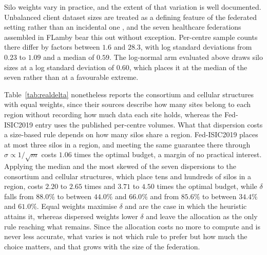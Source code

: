 \documentclass[acmsmall,screen,review,anonymous]{acmart}
\theoremstyle{acmdefinition}%
\begin{document}
Silo weights vary in practice, and the extent of that variation is well
documented. Unbalanced client dataset sizes are treated as a defining feature of
the federated setting rather than an incidental one \cite{kairouz2021advances},
and the seven healthcare federations assembled in FLamby
\cite{terrail2022flamby} bear this out without exception. Per-centre sample
counts there differ by factors between $1.6$ and $28.3$, with log standard
deviations from $0.23$ to $1.09$ and a median of $0.59$. The log-normal arm
evaluated above draws silo sizes at a log standard deviation of $0.60$, which
places it at the median of the seven rather than at a favourable extreme.

Table~\ref{tab:realdelta} nonetheless reports the consortium and cellular
structures with equal weights, since their sources describe how many sites belong
to each region without recording how much data each site holds, whereas the
Fed-ISIC2019 entry uses the published per-centre volumes. What that dispersion
costs a size-based rule depends on how many silos share a region. Fed-ISIC2019
places at most three silos in a region, and meeting the same guarantee there
through $\sigma \propto 1/\sqrt{m}$ costs $1.06$ times the optimal budget, a
margin of no practical interest. Applying the median and the most skewed of the
seven dispersions to the consortium and cellular structures, which place tens and
hundreds of silos in a region, costs $2.20$ to $2.65$ times and $3.71$ to $4.50$
times the optimal budget, while $\delta$ falls from $88.0\%$ to between $44.0\%$
and $66.0\%$ and from $85.6\%$ to between $34.4\%$ and $61.0\%$. Equal weights
maximise $\delta$ and are the case in which the heuristic attains it, whereas
dispersed weights lower $\delta$ and leave the allocation as the only rule
reaching what remains. Since the allocation costs no more to compute and is never
less accurate, what varies is not which rule to prefer but how much the choice
matters, and that grows with the size of the federation.
\end{document}

